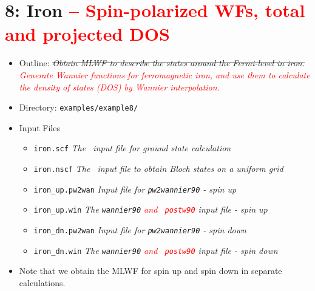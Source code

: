 \documentclass[a4paper,11pt,twoside]{article}
\def\tent#1{\textcolor{red}{#1}}     %
\begin{document}
\cleardoublepage

\section*{8: Iron \tent{-- Spin-polarized WFs, total and projected DOS}}
\begin{itemize}
\item{Outline: \it{\sout{Obtain MLWF to describe the states around the
        Fermi-level in iron.} \tent{Generate Wannier functions for ferromagnetic
        iron, and use them to calculate the density of states (DOS) by Wannier
        interpolation.}}}
\item{Directory: {\tt examples/example8/}}
\item{Input Files}
\begin{itemize}
\item{ {\tt iron.scf}  {\it The \pwscf\ input file for ground state
    calculation}} 
\item{ {\tt iron.nscf}  {\it The \pwscf\ input file to obtain Bloch states
    on a uniform grid}} 
\item{ {\tt iron\_up.pw2wan}  {\it Input file for {\tt pw2wannier90} -
    spin up}} 
\item{ {\tt iron\_up.win} {\it The {\tt wannier90} \tent{and {\tt
          postw90}} input file - spin up}}
\item{ {\tt iron\_dn.pw2wan}  {\it Input file for {\tt pw2wannier90} -
    spin down}} 
\item{ {\tt iron\_dn.win}  {\it The {\tt wannier90} \tent{and {\tt
          postw90}} input file - spin down}}
\end{itemize}
\item{Note that we obtain the MLWF for spin up and spin down in
  separate calculations.} 
\end{itemize}
\end{document}
